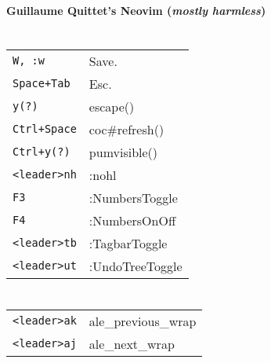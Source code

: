 




\raggedright
\footnotesize

\begin{center}
    \Huge{\textbf{Guillaume Quittet's Neovim (\textit{mostly harmless})}} \\
\end{center}
\vspace*{0.5cm}

\begin{multicols}{3}


\setlength{\premulticols}{1pt}
\setlength{\postmulticols}{1pt}
\setlength{\multicolsep}{1pt}
\setlength{\columnsep}{2pt}

\section{}
\begin{tabular}{@{}ll@{}}
	\verb!W, :w! & Save. \\
	\verb!Space+Tab! & Esc. \\
    \verb!y(?)! & escape() \\
	\verb!Ctrl+Space! & coc\#refresh()\\
    \verb!Ctrl+y(?)! & pumvisible() \\
    \verb!<leader>nh! & :nohl \\
    \verb!F3! & :NumbersToggle \\
    \verb!F4! & :NumbersOnOff \\
    \verb!<leader>tb! & :TagbarToggle \\
    \verb!<leader>ut! & :UndoTreeToggle \\
\end{tabular}

\section{}
\begin{tabular}{@{}ll@{}}
	\verb!<leader>ak! & ale\_previous\_wrap \\
	\verb!<leader>aj! & ale\_next\_wrap \\
\end{tabular}


\end{multicols}
